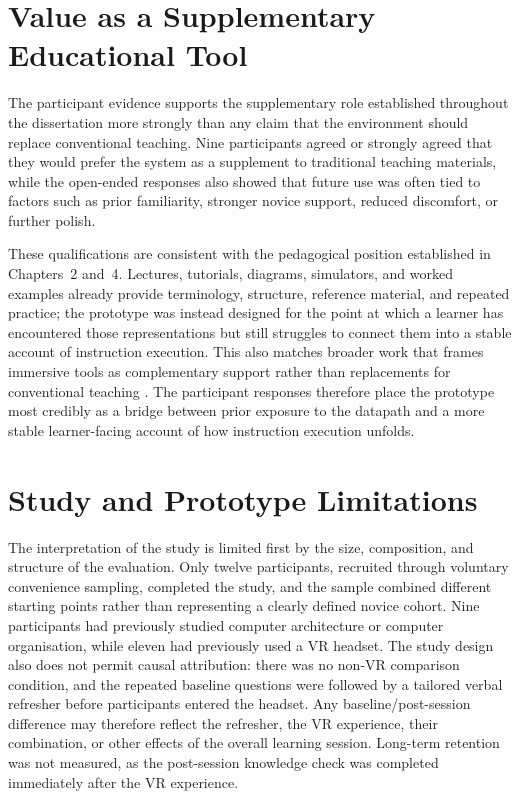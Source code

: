 \section{Value as a Supplementary Educational Tool}

The participant evidence supports the supplementary role established throughout the dissertation more strongly than any claim that the environment should replace conventional teaching. Nine participants agreed or strongly agreed that they would prefer the system as a supplement to traditional teaching materials, while the open-ended responses also showed that future use was often tied to factors such as prior familiarity, stronger novice support, reduced discomfort, or further polish.

These qualifications are consistent with the pedagogical position established in Chapters~2 and~4. Lectures, tutorials, diagrams, simulators, and worked examples already provide terminology, structure, reference material, and repeated practice; the prototype was instead designed for the point at which a learner has encountered those representations but still struggles to connect them into a stable account of instruction execution. This also matches broader work that frames immersive tools as complementary support rather than replacements for conventional teaching \cite{janani2026virtual,mohamad2023immersive,dengel2020important}. The participant responses therefore place the prototype most credibly as a bridge between prior exposure to the datapath and a more stable learner-facing account of how instruction execution unfolds.

\section{Study and Prototype Limitations}

The interpretation of the study is limited first by the size, composition, and structure of the evaluation. Only twelve participants, recruited through voluntary convenience sampling, completed the study, and the sample combined different starting points rather than representing a clearly defined novice cohort. Nine participants had previously studied computer architecture or computer organisation, while eleven had previously used a VR headset. The study design also does not permit causal attribution: there was no non-VR comparison condition, and the repeated baseline questions were followed by a tailored verbal refresher before participants entered the headset. Any baseline/post-session difference may therefore reflect the refresher, the VR experience, their combination, or other effects of the overall learning session. Long-term retention was not measured, as the post-session knowledge check was completed immediately after the VR experience.

